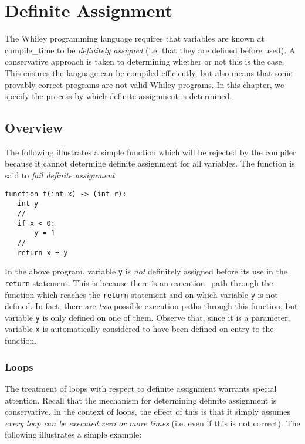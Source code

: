 \chapter{Definite Assignment}
\label{c_definite_assignment}

The Whiley programming language requires that variables are known at \gls{compile_time} to be {\em definitely assigned} (i.e. that they are defined before used).  A conservative approach is taken to determining whether or not this is the case.  This ensures the language can be compiled efficiently, but also means that some provably correct programs are not valid Whiley programs.  In this chapter, we specify the process by which definite assignment is determined.

\section{Overview}

The following illustrates a simple function which will be rejected by the compiler because it cannot determine definite assignment for all variables.  The function is said to {\em fail definite assignment}:

\begin{lstlisting}
function f(int x) -> (int r):
   int y
   //
   if x < 0:
       y = 1
   //
   return x + y
\end{lstlisting}

In the above program, variable \lstinline{y} is {\em not} definitely assigned before its use in the \lstinline{return} statement.  This is because there is an \gls{execution_path} through the function which reaches the \lstinline{return} statement and on which variable \lstinline{y} is not defined.  In fact, there are {\em two} possible execution paths through this function, but variable \lstinline{y} is only defined on one of them.  Observe that, since it is a parameter, variable \lstinline{x} is automatically considered to have been defined on entry to the function.

\subsection{Loops}

The treatment of loops with respect to definite assignment warrants special attention.  Recall that the mechanism for determining definite assignment is conservative.  In the context of loops, the effect of this is that it simply assumes {\em every loop can be executed zero or more times} (i.e. even if this is not correct).  The following illustrates a simple example:

